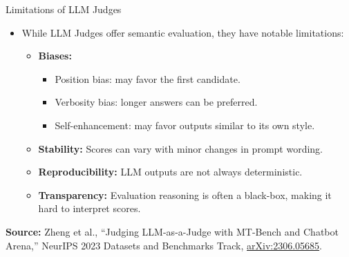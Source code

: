 \begin{frame}[allowframebreaks]{Limitations of LLM Judges}

\begin{itemize}
    \item While LLM Judges offer semantic evaluation, they have notable limitations:

    \begin{itemize}
        \item \textbf{Biases:}  
        \begin{itemize}
            \item Position bias: may favor the first candidate.  
            \item Verbosity bias: longer answers can be preferred.  
            \item Self-enhancement: may favor outputs similar to its own style.
        \end{itemize}

        \item \textbf{Stability:} Scores can vary with minor changes in prompt wording.

        \item \textbf{Reproducibility:} LLM outputs are not always deterministic.

        \item \textbf{Transparency:} Evaluation reasoning is often a black-box, making it hard to interpret scores.
    \end{itemize}
\end{itemize}

\vspace{0.3em}
{\scriptsize \textbf{Source:} Zheng et al., ``Judging LLM-as-a-Judge with MT-Bench and Chatbot Arena,'' NeurIPS 2023 Datasets and Benchmarks Track, \href{https://arxiv.org/abs/2306.05685}{arXiv:2306.05685}.}

\end{frame}


